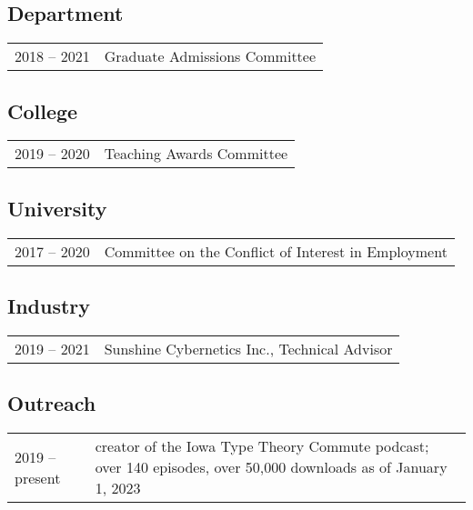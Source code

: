 \documentclass[10pt]{article}
\begin{document}
\begin{IOWA ONLY}
\subsection*{Department}

\begin{tabular}{l@{\quad\ }p{34em}} 
 2018 -- 2021 
 & Graduate Admissions Committee
 \\[.5ex]
\end{tabular}

\subsection*{College}

\begin{tabular}{l@{\quad\ }p{34em}} 
 2019 -- 2020 
 & Teaching Awards Committee
\end{tabular}

\subsection*{University}

\begin{tabular}{l@{\quad\ }p{34em}} 
 2017 -- 2020 
 & Committee on the Conflict of Interest in Employment
 \\[.5ex]
\end{tabular}


\subsection*{Industry}

\begin{tabular}{l@{\quad\ }p{34em}} 
 2019 -- 2021 
 & Sunshine Cybernetics Inc., Technical Advisor
 \\[.5ex]
\end{tabular}

\subsection*{Outreach}

\begin{tabular}{l@{\quad\ }p{34em}} 
 2019 -- present 
 & creator of the Iowa Type Theory Commute podcast; over 140 episodes, over 50,000 downloads as of January 1, 2023
 \\[.5ex]
\end{tabular}


\end{IOWA ONLY}
\end{document}
